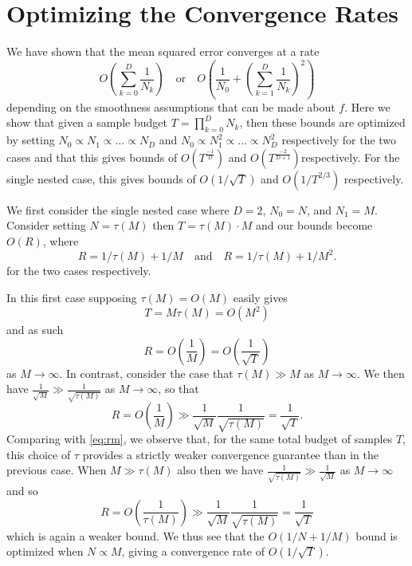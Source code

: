 
\section{Optimizing the Convergence Rates}
\label{sec:app:opt-conv}

We have shown that the mean squared error converges at a rate \[
O\left(\sum_{k=0}^{D} \frac{1}{N_k}\right) \quad \mathrm{or} \quad 
O\left(\frac{1}{N_0} +\left(\sum_{k=1}^{D} \frac{1}{N_k}\right)^2\right)
\]
 depending on the smoothness assumptions that can be made about
$f$.  Here we show that given a sample budget $T=\prod_{k=0}^{D} N_k$, then these bounds are
optimized by setting $N_0 \propto N_1 \propto \dots \propto N_D$ and 
$N_0 \propto N_1^2 \propto \dots \propto N_D^2$ respectively for the two cases and that this
gives bounds of $O(T^{\frac{-1}{D}})$ and $O(T^{\frac{-2}{D+1}})$respectively.  For the single
nested case, this gives bounds of $O(1/\sqrt{T})$ and $O(1/T^{2/3})$ respectively.

We first consider the single nested case where $D=2$, $N_0=N$, and $N_1=M$.
Consider setting $N = \tau(M)$ then $T = \tau(M) \cdot M$ and our bounds become $O(R)$, where
\[
  R = 1/\tau(M) + 1/M \quad \text{and} \quad R = 1/\tau(M) + 1/M^2.
\]
for the two cases respectively.

In this first case supposing $\tau(M) = O(M)$ easily gives
\[
  T = M \tau(M)
    = O\left(M^2\right)
\]
and as such 
\begin{equation} \label{eq:rm}
  R = O\left(\frac{1}{M}\right) = O\left(\frac{1}{\sqrt{T}}\right)
\end{equation}
as $M \to \infty$.  In contrast, consider the case that $\tau(M) \gg M$ as $M \to \infty$. We then have
$\frac{1}{\sqrt{M}} \gg \frac{1}{\sqrt{\tau(M)}}$ as $M \to \infty$, so that
\[
  R = O\left(\frac{1}{M}\right) \gg \frac{1}{\sqrt{M}} \frac{1}{\sqrt{\tau(M)}} = \frac{1}{\sqrt{T}}.
\]
Comparing with \eqref{eq:rm}, we observe that, for the same total
budget of samples $T$, this choice of $\tau$ provides a strictly weaker convergence
guarantee than in the previous case. When $M \gg \tau(M)$ also then we have
$\frac{1}{\sqrt{\tau(M)}} \gg \frac{1}{\sqrt{M}}$ as $M \to \infty$ and so
\[
R = O\left(\frac{1}{\tau(M)}\right) \gg \frac{1}{\sqrt{M}} \frac{1}{\sqrt{\tau(M)}} = \frac{1}{\sqrt{T}}
\]
which is again a weaker bound.  We thus see that the $O(1/N + 1/M)$ bound is optimized when
$N \propto M$, giving a convergence rate of $O(1/\sqrt{T})$.

